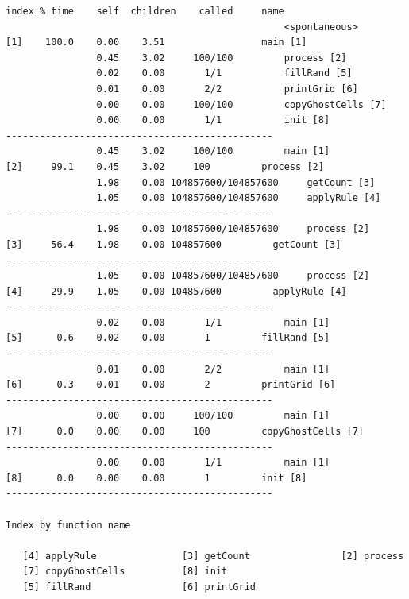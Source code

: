 \documentclass[11pt]{article} %
\begin{document}
\begin{verbatim}
index % time    self  children    called     name
                                                 <spontaneous>
[1]    100.0    0.00    3.51                 main [1]
                0.45    3.02     100/100         process [2]
                0.02    0.00       1/1           fillRand [5]
                0.01    0.00       2/2           printGrid [6]
                0.00    0.00     100/100         copyGhostCells [7]
                0.00    0.00       1/1           init [8]
-----------------------------------------------
                0.45    3.02     100/100         main [1]
[2]     99.1    0.45    3.02     100         process [2]
                1.98    0.00 104857600/104857600     getCount [3]
                1.05    0.00 104857600/104857600     applyRule [4]
-----------------------------------------------
                1.98    0.00 104857600/104857600     process [2]
[3]     56.4    1.98    0.00 104857600         getCount [3]
-----------------------------------------------
                1.05    0.00 104857600/104857600     process [2]
[4]     29.9    1.05    0.00 104857600         applyRule [4]
-----------------------------------------------
                0.02    0.00       1/1           main [1]
[5]      0.6    0.02    0.00       1         fillRand [5]
-----------------------------------------------
                0.01    0.00       2/2           main [1]
[6]      0.3    0.01    0.00       2         printGrid [6]
-----------------------------------------------
                0.00    0.00     100/100         main [1]
[7]      0.0    0.00    0.00     100         copyGhostCells [7]
-----------------------------------------------
                0.00    0.00       1/1           main [1]
[8]      0.0    0.00    0.00       1         init [8]
-----------------------------------------------

Index by function name

   [4] applyRule               [3] getCount                [2] process
   [7] copyGhostCells          [8] init
   [5] fillRand                [6] printGrid

\end{verbatim}
\endgroup
\pagebreak
\end{document}

